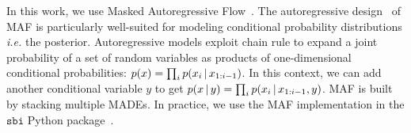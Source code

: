In this work, we use Masked Autoregressive
Flow~\citep[MAF;][]{papamakarios2017}. 
The autoregressive design~\citep{uria2016} of MAF is particularly well-suited
for modeling conditional probability distributions \emph{i.e.} the posterior. 
Autoregressive models exploit chain rule to expand a joint probability of a set
of random variables as products of one-dimensional conditional probabilities:
$p(x) = \prod_i p(x_i\,|\, x_{1:i-1})$. 
In this context, we can add another conditional variable $y$ to get 
$p(x\,|\, y) = \prod_i p(x_i\,|\, x_{1:i-1}, y)$. 
MAF is built by stacking multiple MADEs. 
In practice, we use the MAF implementation in the $\mathtt{sbi}$ Python
package~\citep{greenberg2019, tejero-cantero2020}.
